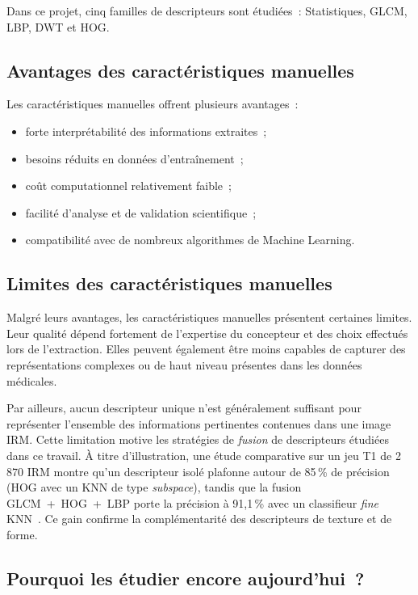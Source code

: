 Dans ce projet, cinq familles de descripteurs sont étudiées~: Statistiques, GLCM, LBP, DWT et
HOG.

\subsection{Avantages des caractéristiques manuelles}

Les caractéristiques manuelles offrent plusieurs avantages~:

\begin{itemize}[leftmargin=1.4em,itemsep=2pt]
  \item forte interprétabilité des informations extraites~;
  \item besoins réduits en données d'entraînement~;
  \item coût computationnel relativement faible~;
  \item facilité d'analyse et de validation scientifique~;
  \item compatibilité avec de nombreux algorithmes de Machine Learning.
\end{itemize}

\subsection{Limites des caractéristiques manuelles}

Malgré leurs avantages, les caractéristiques manuelles présentent certaines limites. Leur
qualité dépend fortement de l'expertise du concepteur et des choix effectués lors de
l'extraction. Elles peuvent également être moins capables de capturer des représentations
complexes ou de haut niveau présentes dans les données médicales.

Par ailleurs, aucun descripteur unique n'est généralement suffisant pour représenter
l'ensemble des informations pertinentes contenues dans une image IRM. Cette limitation motive
les stratégies de \emph{fusion} de descripteurs étudiées dans ce travail. À titre
d'illustration, une étude comparative sur un jeu T1 de 2\,870 IRM montre qu'un descripteur
isolé plafonne autour de 85\,\% de précision (HOG avec un KNN de type \emph{subspace}), tandis
que la fusion GLCM~+~HOG~+~LBP porte la précision à 91,1\,\% avec un classifieur \emph{fine}
KNN~\cite{ref-pattanaik}. Ce gain confirme la complémentarité des descripteurs de texture et de forme.

\subsection{Pourquoi les étudier encore aujourd'hui~?}

